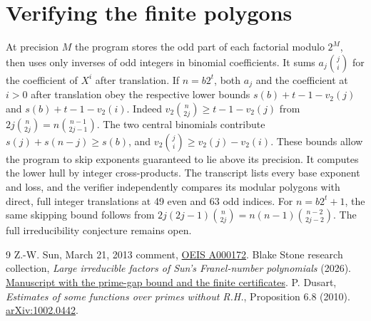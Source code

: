 \documentclass[11pt]{article}
\newcommand{\val}{v_2}
\begin{document}
\section{Verifying the finite polygons}
At precision $M$ the program stores the odd part of each factorial modulo $2^M$, then uses only inverses of odd integers in binomial coefficients. It sums $a_j\binom ji$ for the coefficient of $X^i$ after translation. If $n=b2^t$, both $a_j$ and the coefficient at $i>0$ after translation obey the respective lower bounds $s(b)+t-1-\val(j)$ and $s(b)+t-1-\val(i)$. Indeed $\val\binom n{2j}\ge t-1-\val(j)$ from $2j\binom n{2j}=n\binom{n-1}{2j-1}$. The two central binomials contribute $s(j)+s(n-j)\ge s(b)$, and $\val\binom ji\ge\val(j)-\val(i)$. These bounds allow the program to skip exponents guaranteed to lie above its precision. It computes the lower hull by integer cross-products. The transcript lists every base exponent and loss, and the verifier independently compares its modular polygons with direct, full integer translations at 49 even and 63 odd indices. For $n=b2^t+1$, the same skipping bound follows from $2j(2j-1)\binom n{2j}=n(n-1)\binom{n-2}{2j-2}$. The full irreducibility conjecture remains open.
\begin{thebibliography}{9}
 Z.-W. Sun, March 21, 2013 comment, \href{https://oeis.org/A000172/internal}{OEIS A000172}.
 Blake Stone research collection, \emph{Large irreducible factors of Sun's Franel-number polynomials} (2026). \href{https://github.com/blakestone-x/math/blob/c18014b822980b0d6cb9b78fc228e5efda2718c6/A000172/manuscript.pdf}{Manuscript with the prime-gap bound and the finite certificates}.
 P. Dusart, \emph{Estimates of some functions over primes without R.H.}, Proposition 6.8 (2010). \href{https://arxiv.org/abs/1002.0442}{arXiv:1002.0442}.
\end{thebibliography}
\end{document}
